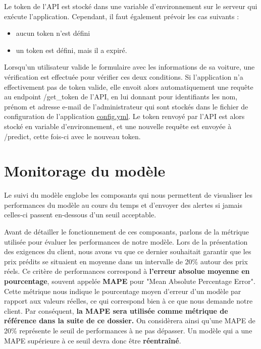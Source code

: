 \documentclass[french]{article}
\begin{document}
    Le token de l'API est stocké dans une variable d'environnement sur le serveur qui exécute l'application. Cependant, il faut également prévoir les cas suivants :
    \begin{itemize}
        \item aucun token n'est défini
        \item un token est défini, mais il a expiré.
    \end{itemize}

    Lorsqu'un utilisateur valide le formulaire avec les informations de sa voiture, une vérification est effectuée pour vérifier ces deux conditions. Si l'application n'a effectivement pas de token valide, elle envoit alors automatiquement une requête au endpoint /get\_token de l'API, en lui donnant pour identifiants les nom, prénom et adresse e-mail de l'administrateur qui sont stockés dans le fichier de configuration de l'application \href{https://github.com/vinpap/iargus_app/blob/4b5f8b114a623f38f883587913b486281657ead5/config.yml}{config.yml}. Le token renvoyé par l'API est alors stocké en variable d'environnement, et une nouvelle requête est envoyée à /predict, cette fois-ci avec le nouveau token.

    \section{Monitorage du modèle}

    Le suivi du modèle englobe les composants qui nous permettent de visualiser les performances du modèle au cours du temps et d'envoyer des alertes si jamais celles-ci passent en-dessous d'un seuil acceptable. 
    
    Avant de détailler le fonctionnement de ces composants, parlons de la métrique utilisée pour évaluer les performances de notre modèle. Lors de la présentation des exigences du client, nous avons vu que ce dernier souhaitait garantir que les prix prédits se situaient en moyenne dans un intervalle de 20\% autour des prix réels. Ce critère de performances correspond à \textbf{l'erreur absolue moyenne en pourcentage}, souvent appelée \textbf{MAPE} pour "Mean Absolute Percentage Error". Cette métrique nous indique le pourcentage moyen d'erreur d'un modèle par rapport aux valeurs réelles, ce qui correspond bien à ce que nous demande notre client. Par conséquent, \textbf{la MAPE sera utilisée comme métrique de référence dans la suite de ce dossier.} On considèrera ainsi qu'une MAPE de 20\% représente le seuil de performances à ne pas dépasser. Un modèle qui a une MAPE supérieure à ce seuil devra donc être \textbf{réentraîné}.
\end{document}
